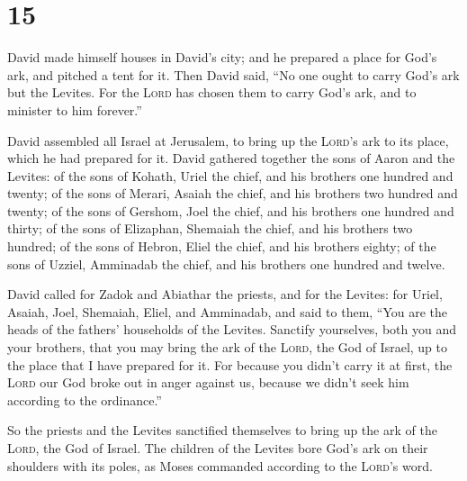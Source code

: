 \hypertarget{section-14}{%
\section{15}\label{section-14}}

 David made himself houses in David's city; and he
prepared a place for God's ark, and pitched a tent for it.
 Then David said, ``No one ought to carry God's ark but
the Levites. For the \textsc{Lord} has chosen them to carry God's ark,
and to minister to him forever.''

 David assembled all Israel at Jerusalem, to bring up the
\textsc{Lord}'s ark to its place, which he had prepared for it.
 David gathered together the sons of Aaron and the
Levites:  of the sons of Kohath, Uriel the chief, and his
brothers one hundred and twenty;  of the sons of Merari,
Asaiah the chief, and his brothers two hundred and twenty;
 of the sons of Gershom, Joel the chief, and his brothers
one hundred and thirty;  of the sons of Elizaphan,
Shemaiah the chief, and his brothers two hundred;  of the
sons of Hebron, Eliel the chief, and his brothers eighty;
 of the sons of Uzziel, Amminadab the chief, and his
brothers one hundred and twelve.

 David called for Zadok and Abiathar the priests, and for
the Levites: for Uriel, Asaiah, Joel, Shemaiah, Eliel, and Amminadab,
 and said to them, ``You are the heads of the fathers'
households of the Levites. Sanctify yourselves, both you and your
brothers, that you may bring the ark of the \textsc{Lord}, the God of
Israel, up to the place that I have prepared for it.  For
because you didn't carry it at first, the \textsc{Lord} our God broke
out in anger against us, because we didn't seek him according to the
ordinance.''

 So the priests and the Levites sanctified themselves to
bring up the ark of the \textsc{Lord}, the God of Israel.
 The children of the Levites bore God's ark on their
shoulders with its poles, as Moses commanded according to the
\textsc{Lord}'s word.

